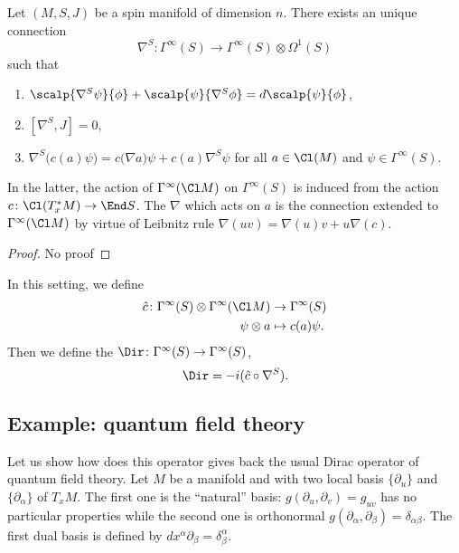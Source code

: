 \begin{theorem}
Let $(M,S,J)$ be a spin manifold of dimension $n$. There exists an unique connection 
\[ 
  \nabla^S\colon \Gamma^{\infty}(S)\to \Gamma^{\infty}(S)\otimes\Omega^1(S)
\]
such that
\begin{enumerate}
\item $\scalp{ \nabla^S\psi }{ \phi }+\scalp{ \psi }{ \nabla^S\phi }=d\scalp{ \psi }{ \phi }$,
\item $[\nabla^S,J]=0$,
\item $\nabla^S\big( c(a)\psi \big)=c\big( \nabla a \big)\psi+c(a)\nabla^S\psi$ for all $a\in\Cl(M)$ and $\psi\in\Gamma^{\infty}(S)$.
\end{enumerate}
In the latter, the action of $\Gamma^{\infty}(\Cl M)$ on $\Gamma^{\infty}(S)$ is induced from the action $c\colon \Cl(T^*_xM)\to \End S$. The $\nabla$ which acts on $a$ is the connection extended to $\Gamma^{\infty}(\Cl M)$ by virtue of Leibnitz rule $\nabla(uv)=\nabla(u)v+u\nabla(c)$.

\end{theorem}

\begin{proof}
No proof
\end{proof}


In this setting, we define 
\begin{equation}
\begin{aligned}
 \hat c\colon\Gamma^{\infty}(S)\otimes\Gamma^{\infty}(\Cl M)&\to \Gamma^{\infty}(S) \\ 
 \psi\otimes a&\mapsto c(a)\psi. 
\end{aligned}
\end{equation}
Then we define the  $\Dir\colon \Gamma^{\infty}(S)\to \Gamma^{\infty}(S)$,
\begin{equation}
  \Dir=-i(\hat c\circ\nabla^S).
\end{equation}

\subsection{Example: quantum field theory}

Let us show how does this operator gives back the usual Dirac operator of quantum field theory. Let $M$ be a manifold and with two local basis $\{ \partial_u \}$ and $\{ \partial_{\alpha} \}$ of $T_xM$. The first one is the ``natural'' basis: $g(\partial_u,\partial_v)=g_{uv}$ has no particular properties while the second one is orthonormal $g(\partial_{\alpha},\partial_{\beta})=\delta_{\alpha\beta}$. The first dual basis is defined by $dx^{\alpha}\partial_{\beta}=\delta^{\alpha}_{\beta}$. 

